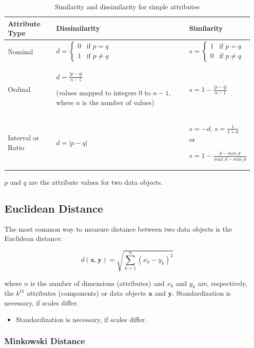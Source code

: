\begin{table}[htbp]
\centering
\caption{Similarity and dissimilarity for simple attributes}
\begin{tabular}{|p{3cm}|p{6cm}|p{4cm}|}
\hline
\textbf{Attribute Type} & \textbf{Dissimilarity} & \textbf{Similarity} \\
\hline
Nominal & 
$d = \begin{cases}
0 & \text{if } p = q \\
1 & \text{if } p \neq q
\end{cases}$ & 
$s = \begin{cases}
1 & \text{if } p = q \\
0 & \text{if } p \neq q
\end{cases}$ \\
\hline
Ordinal & 
$d = \frac{|p-q|}{n-1}$

(values mapped to integers 0 to $n-1$, where $n$ is the number of values) & 
$s = 1 - \frac{|p-q|}{n-1}$ \\
\hline
Interval or Ratio & 
$d = |p - q|$ & 
$s = -d$, $s = \frac{1}{1+d}$ or

$s = 1 - \frac{d-min\_d}{max\_d-min\_d}$ \\
\hline
\end{tabular}
\label{tab:similarity_attributes}
\end{table}

$p$ and $q$ are the attribute values for two data objects.

\subsection{Euclidean Distance}
The most common way to measure distance between two data objects is the Euclidean distance:

\[
d(\mathbf{x}, \mathbf{y}) = \sqrt{\sum_{k=1}^{n}(x_k - y_k)^2}
\]

where $n$ is the number of dimensions (attributes) and $x_k$ and $y_k$ are, respectively, the $k^{th}$ attributes (components) or data objects $\mathbf{x}$ and $\mathbf{y}$. Standardization is necessary, if scales differ.

\begin{itemize}
    \item Standardization is necessary, if scales differ.
\end{itemize}


\subsubsection{Minkowski Distance}

